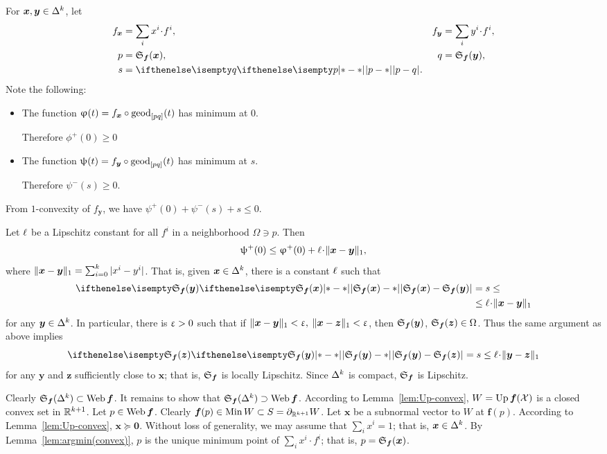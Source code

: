 For $\bm{x},\bm{y}\in\Delta^\kay$,
let 
\begin{align*}
f_{\bm{x}}
&=\sum_i x^i\cdot f^i,
&
f_{\bm{y}}
&=\sum_i y^i\cdot f^i,
\\
p
&=\spx{\bm{f}}(\bm{x}),
&
q
&=\spx{\bm{f}}(\bm{y}),
\\
s&=\dist{p}{q}{}.
\end{align*}
Note the following:
\begin{itemize}
\item The function $\phi(t)=f_{\bm{x}}\circ\geod_{[p q]}(t)$ has minimum at $0$. 

Therefore $\phi^+(0)\ge 0$
\item The function $\psi(t)=f_{\bm{y}}\circ\geod_{[p q]}(t)$ has minimum at $s$. 

Therefore $\psi^-(s)\ge 0$.
\end{itemize}
From $1$-convexity of $f_{\bm{y}}$, we have
$\psi^+(0)+\psi^-(s)+s\le0$.

Let ${\ell}$ be a Lipschitz constant for all $f^i$ in a neighborhood $\Omega\ni p$.
Then 
\[\psi^+(0)
\le 
\phi^+(0)+\Lip\cdot\|\bm{x}-\bm{y}\|_1,\] 
where $\|\bm{x}-\bm{y}\|_1=\sum_{i=0}^k|x^i-y^i|$.
That is, given $\bm{x}\in\Delta^\kay$, there is a constant ${\ell}$ such that
\begin{align*}
\dist{\spx{\bm{f}}(\bm{x})}{\spx{\bm{f}}(\bm{y})}{}
&=
s
\le
\\
&\le 
\Lip\cdot\|\bm{x}-\bm{y}\|_1
\end{align*}
for any $\bm{y}\in\Delta^\kay$.
In particular, there is $\upvarepsilon>0$ such that if $\|\bm{x}-\bm{y}\|_1<\upvarepsilon,$ $\|\bm{x}-\bm{z}\|_1 <\upvarepsilon$, then $\mathfrak{S}_{\bm{f}}(\bm{y})$, $\spx{\bm{f}}(\bm{z})\in\Omega$. 
Thus the same argument as above implies 
\[\dist{\spx{\bm{f}}(\bm{y})}{\spx{\bm{f}}(\bm{z})}{}
=
s\le \Lip\cdot\|\bm{y}-\bm{z}\|_1\]
for any $\bm{y}$ and $\bm{z}$ sufficiently close to $\bm{x}$; that is, $\mathfrak{S}_{\bm{f}}$ is locally Lipschitz.
Since $\Delta^k$ is compact, $\mathfrak{S}_{\bm{f}}$ is Lipschitz.

Clearly $\spx{\bm{f}}(\Delta^\kay)\subset \Web \bm{f}$.
It remains to show that $\spx{\bm{f}}(\Delta^\kay)\supset \Web \bm{f}$.
According to Lemma~\ref{lem:Up-convex},
$W=\mathop{\rm Up}\nolimits\bm{f}(\mathcal{X})$ is a closed convex set in $\mathbb{R}^{k+1}$.
Let $p\in \Web \bm{f}$. 
Clearly $\bm{f}(p)\in \Min W\subset S\z=\Fr_{\RR^{\kay+1}}W$.
Let $\bm{x}$ be a subnormal vector to $W$ at $\bm{f}(p)$.
According to Lemma~\ref{lem:Up-convex}, 
$\bm{x} \succcurlyeq\bm{0}$.
Without loss of generality, we may assume that $\sum_i x^i=1$;
that is, $\bm{x}\in \Delta^\kay$.
By Lemma~\ref{lem:argmin(convex)},
$p$ is the unique minimum point of $\sum_i x^i\cdot f^i$;
that is, $p=\mathfrak{S}_{\bm{f}}(\bm{x})$.
\qeds








